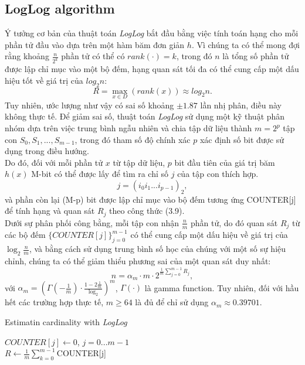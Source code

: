 \documentclass[letterpaper,13pt]{article}
\theoremstyle{mytheor}
\begin{document}
\subsection{LogLog algorithm}
Ý tưởng cơ bản của thuật toán \textit{LogLog} bắt đầu bằng việc tính toán hạng cho mỗi phần tử đầu vào dựa trên một hàm băm đơn giản $h$. Vì chúng ta 
có thể mong đợi rằng khoảng $\frac{n}{2^k}$ phần tử có thể có $rank(\cdot) = k$, trong đó $n$ là tổng số phần tử được lập chỉ mục vào một bộ đếm, 
hạng quan sát tối đa có thể cung cấp một dấu hiệu tốt về giá trị của $log_2n$:
\[R = \underset{x \in D}{\max}\left(rank(x)\right) \approx log_2n.\]
Tuy nhiên, ước lượng như vậy có sai số khoảng $\pm1.87$ lần nhị phân, điều này không thực tế. Để giảm sai số, thuật toán \textit{LogLog} sử dụng 
một kỹ thuật phân nhóm dựa trên việc trung bình ngẫu nhiên và chia tập dữ liệu thành $m = 2^p$ tập con $S_0, S_1,..., S_{m-1}$, trong đó tham số 
độ chính xác $p$ xác định số bit được sử dụng trong điều hướng.\\
Do đó, đối với mỗi phần tử $x$ từ tập dữ liệu, $p$ bit đầu tiên của giá trị băm $h(x)$ M-bit có thể được lấy để tìm ra chỉ số $j$ của tập con thích hợp.
\[j = \left(i_0i_1...i_{p-1}\right)_2,\]
và phần còn lại (M-p) bit được lập chỉ mục vào bộ đếm tương ứng COUNTER[j] để tính hạng và quan sát $R_j$ theo công thức (3.9).\\
Dưới sự phân phối công bằng, mỗi tập con nhận $\frac{n}{m}$ phần tử, do đó quan sát $R_j$ từ các bộ đếm $\{COUNTER[j]\}_{j=0}^{m-1}$ có thể cung cấp 
một dấu hiệu về giá trị của $\log_2{\frac{n}{m}}$, và bằng cách sử dụng trung bình số học của chúng với một số sự hiệu chỉnh, chúng ta có thể 
giảm thiểu phương sai của một quan sát duy nhất:
\[
    n = \alpha_m \cdot m \cdot 2 ^{\frac{1}{m}\sum\limits_{j=0}^{m-1}R_j},
\]
với $\alpha_m = \left(\Gamma\left(-\frac{1}{m}\right)\cdot \frac{1-2\frac{1}{m}}{\log_2}\right)^m$, $\Gamma(\cdot)$ là gamma function. 
Tuy nhiên, đối với hầu hết các trường hợp thực tế, $m \geq 64$ là đủ để chỉ sử dụng $\alpha_m \approx 0.39701$.\\

\begin{algorithm}[H]
    \vspace{0.25cm}
    \DontPrintSemicolon
    \LinesNumberedHidden
    \caption[]{Estimatin cardinality with \textit{LogLog}}
    $COUNTER[j] \gets $0, $j = 0...m - 1$\\
    $R \gets \frac{1}{m} \sum\limits_{k=0}^{m-1}$COUNTER[j] \\
    \vspace{0.25cm}
\end{algorithm}
\vspace{0.25cm}
\end{document}
